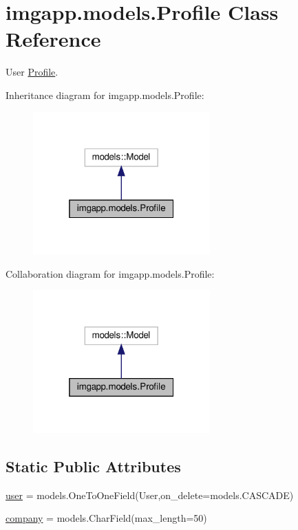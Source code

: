 \hypertarget{classimgapp_1_1models_1_1Profile}{}\section{imgapp.\+models.\+Profile Class Reference}
\label{classimgapp_1_1models_1_1Profile}


User \hyperlink{classimgapp_1_1models_1_1Profile}{Profile}.  




Inheritance diagram for imgapp.\+models.\+Profile\+:\nopagebreak
\begin{figure}[H]
\begin{center}
\leavevmode
\includegraphics[width=193pt]{classimgapp_1_1models_1_1Profile__inherit__graph}
\end{center}
\end{figure}


Collaboration diagram for imgapp.\+models.\+Profile\+:\nopagebreak
\begin{figure}[H]
\begin{center}
\leavevmode
\includegraphics[width=193pt]{classimgapp_1_1models_1_1Profile__coll__graph}
\end{center}
\end{figure}
\subsection*{Static Public Attributes}
\begin{DoxyCompactItemize}
\item 
\hyperlink{classimgapp_1_1models_1_1Profile_a42a93bae8e707591dbd2eea4f5f2cb28}{user} = models.\+One\+To\+One\+Field(User,on\+\_\+delete=models.\+C\+A\+S\+C\+A\+DE)
\item 
\hyperlink{classimgapp_1_1models_1_1Profile_a7204f3b8cc0278caf80fab184397f7ae}{company} = models.\+Char\+Field(max\+\_\+length=50)
\end{DoxyCompactItemize}


